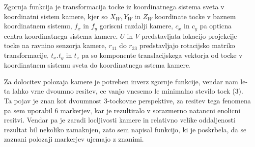 \documentclass[a4paper,twoside,openright,12pt,slovene]{book}
\begin{document}
Zgornja funkcija je transformacija tocke iz koordinatnega sistema sveta v koordinatni sistem kamere, kjer so \begin{math} X_W, Y_W \end{math} in \begin{math} Z_W\end{math} koordinate tocke v baznem koordinatnem sistemu, \begin{math} f_x \end{math} in \begin{math} f_y \end{math} goriscni razdalji kamere, \begin{math} c_x \end{math} in \begin{math} c_y \end{math} pa opticna centra koordinatnega sistema kamere. \begin{math} U \end{math} in \begin{math} V \end{math} predstavljata lokacijo projekcije tocke na ravnino senzorja kamere, \begin{math} r_11 \end{math} do \begin{math} r_33 \end{math} predstavljajo rotacijsko matriko transformacije, \begin{math} t_x. t_y \end{math} in \begin{math} t_z \end{math} pa so komponente translacijskega vektorja od tocke v koordinatnem sistemu sveta do koordinatnega sstema kamere.

Za dolocitev polozaja kamere je potreben inverz zgornje funkcije, vendar nam le-ta lahko vrne dvoumno resitev, ce vanjo vnesemo le minimalno stevilo tock (3). Ta pojav je znan kot dvoumnost 3-tockovne perspektive, za resitev tega fenomena pa sem uporabil 6 markerjev, kar je rezultiralo v sorazmerno natancni enolicni resitvi. Vendar pa je zaradi locljivosti kamere in relativno velike oddaljenosti rezultat bil nekoliko zamaknjen, zato sem napisal funkcijo, ki je poskrbela, da se zaznani polozaji markerjev ujemajo z znanimi.
\end{document}
